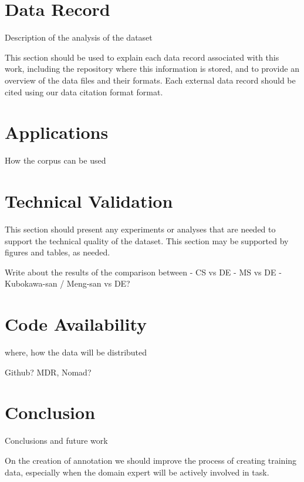 \documentclass[a4paper,10pt]{article}
\begin{document}
\section{Data Record}
Description of the analysis of the dataset 

This section should be used to explain each data record associated with this work, including the repository where this information is stored, and to provide an overview of the data files and their formats. Each external data record should be cited using our data citation format format.


\section{Applications}
How the corpus can be used

\section{Technical Validation} 
This section should present any experiments or analyses that are needed to support the technical quality of the dataset. This section may be supported by figures and tables, as needed.

Write about the results of the comparison between 
- CS vs DE 
- MS vs DE
- Kubokawa-san / Meng-san vs DE? 


\section{Code Availability}
where, how the data will be distributed 

Github? MDR, Nomad? 


\section{Conclusion}
Conclusions and future work 

On the creation of annotation we should improve the process of creating training data, especially when the domain expert will be actively involved in task. 


  
\end{document}
